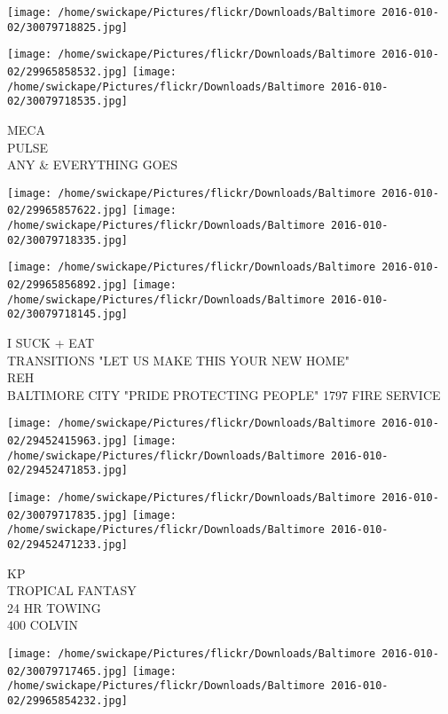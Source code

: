 \documentclass[10pt,letterpaper]{article}
\begin{document}
\texttt{[image: /home/swickape/Pictures/flickr/Downloads/Baltimore 2016-010-02/30079718825.jpg]}

\vspace{0.25in}
\texttt{[image: /home/swickape/Pictures/flickr/Downloads/Baltimore 2016-010-02/29965858532.jpg]}
\texttt{[image: /home/swickape/Pictures/flickr/Downloads/Baltimore 2016-010-02/30079718535.jpg]}

MECA\\
PULSE\\
ANY \& EVERYTHING GOES\\
\pagebreak

\texttt{[image: /home/swickape/Pictures/flickr/Downloads/Baltimore 2016-010-02/29965857622.jpg]}
\texttt{[image: /home/swickape/Pictures/flickr/Downloads/Baltimore 2016-010-02/30079718335.jpg]}

\texttt{[image: /home/swickape/Pictures/flickr/Downloads/Baltimore 2016-010-02/29965856892.jpg]}
\texttt{[image: /home/swickape/Pictures/flickr/Downloads/Baltimore 2016-010-02/30079718145.jpg]}

I SUCK + EAT\\
TRANSITIONS "LET US MAKE THIS YOUR NEW HOME"\\
REH\\
BALTIMORE CITY "PRIDE PROTECTING PEOPLE" 1797 FIRE SERVICE\\
\pagebreak

\texttt{[image: /home/swickape/Pictures/flickr/Downloads/Baltimore 2016-010-02/29452415963.jpg]}
\texttt{[image: /home/swickape/Pictures/flickr/Downloads/Baltimore 2016-010-02/29452471853.jpg]}

\texttt{[image: /home/swickape/Pictures/flickr/Downloads/Baltimore 2016-010-02/30079717835.jpg]}
\texttt{[image: /home/swickape/Pictures/flickr/Downloads/Baltimore 2016-010-02/29452471233.jpg]}

KP\\
TROPICAL FANTASY\\
24 HR TOWING\\
400 COLVIN\\
\pagebreak

\texttt{[image: /home/swickape/Pictures/flickr/Downloads/Baltimore 2016-010-02/30079717465.jpg]}
\texttt{[image: /home/swickape/Pictures/flickr/Downloads/Baltimore 2016-010-02/29965854232.jpg]}
\end{document}
